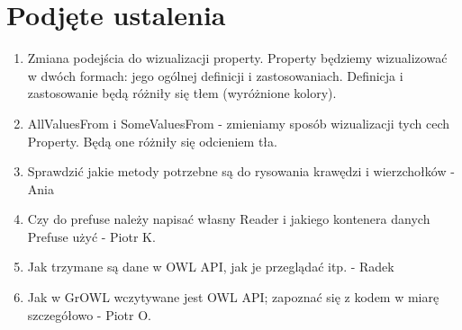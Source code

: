 \documentclass[a4paper,10pt]{article}
\begin{document}
\section{Podjęte ustalenia}
\begin{enumerate}
\item  Zmiana podejścia do wizualizacji property. Property będziemy wizualizować w dwóch formach: jego ogólnej definicji i zastosowaniach. Definicja i zastosowanie będą różniły się tłem (wyróżnione kolory).
\item  AllValuesFrom i SomeValuesFrom - zmieniamy sposób wizualizacji tych cech Property. Będą one różniły się odcieniem tła.  
\item  Sprawdzić jakie metody potrzebne są do rysowania krawędzi i wierzchołków - Ania
\item  Czy do prefuse należy napisać własny Reader i jakiego kontenera danych Prefuse użyć - Piotr K.
\item  Jak trzymane są dane w OWL API, jak je przeglądać itp. - Radek
\item  Jak w GrOWL wczytywane jest OWL API; zapoznać się z kodem w miarę szczegółowo - Piotr O.
\end{enumerate}



\clearpage
{}
{}

\end{document}

